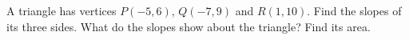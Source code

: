 A triangle has vertices $P(-5,6)$, $Q(-7,9)$ and $R(1,10)$. Find the slopes of its three sides. What do the slopes show about the triangle? Find its area.
